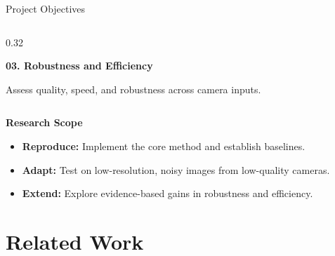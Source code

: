\documentclass[
    11pt,%
    aspectratio=169,%
]{beamer}
\begin{document}
\begin{frame}{Project Objectives}
\begin{columns}[T, onlytextwidth]
    \begin{column}{0.32\textwidth}
        \begin{beamercolorbox}[
            rounded=true,
            sep=0.10cm,
            wd=\linewidth
        ]{}
            {\color{orange!85!black}\bfseries 03. Robustness and Efficiency}

            \vspace{0.07cm}

            \fontsize{8.5}{10}\selectfont
            Assess quality, speed, and robustness across camera inputs.
        \end{beamercolorbox}
    \end{column}

\end{columns}

\vspace{0.18cm}

{\color{Navy}\bfseries Research Scope}

\vspace{0.05cm}

\begin{itemize}
    \setlength{\itemsep}{1pt}
    \setlength{\parskip}{0pt}

    \item \textbf{Reproduce:} Implement the core method and establish baselines.

    \item \textbf{Adapt:} Test on low-resolution, noisy images from low-quality cameras.

    \item \textbf{Extend:} Explore evidence-based gains in robustness and efficiency.
\end{itemize}

\end{frame}


\section{Related Work}
\end{document}
